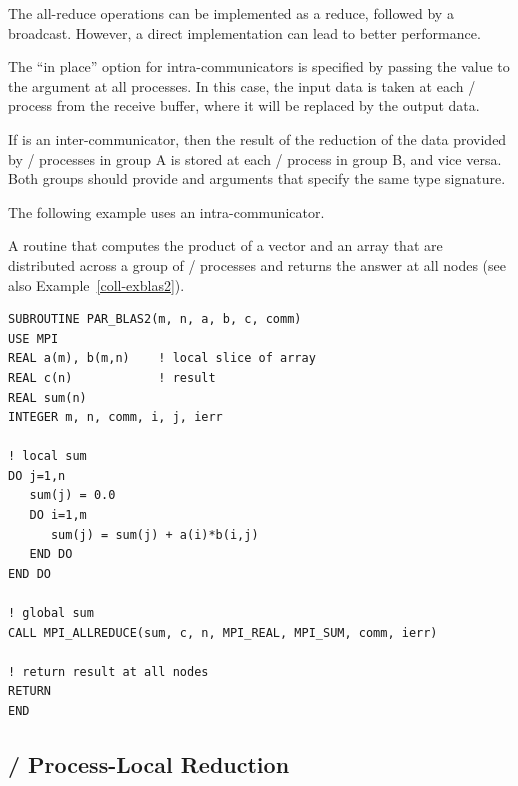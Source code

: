 \begin{implementors}
The all-reduce operations can be implemented as a reduce, followed by a
broadcast.  However, a direct implementation can lead to better performance.
\end{implementors}

The ``in place'' option  for intra-communicators is specified by passing the
value  to the argument 
at all processes.
In this case,
the input data is taken at each \MPI/ process from the receive buffer,
where it will be replaced by the output data.

If  is an inter-communicator, then the result of the reduction
of the data provided by \MPI/ processes in group A is stored at each \MPI/ process
in group B, and vice versa.
Both groups should
provide  and  arguments that specify the same type
signature.

The following example uses an intra-communicator.

\begin{example}
\label{coll-exallblas2}
%
A routine that computes
the product of a vector and an array that are distributed across a
group of \MPI/ processes and returns the answer at all nodes (see also
Example~\ref{coll-exblas2}).

\begin{lstlisting}[language={[MPI]Fortran}]
SUBROUTINE PAR_BLAS2(m, n, a, b, c, comm)
USE MPI
REAL a(m), b(m,n)    ! local slice of array
REAL c(n)            ! result
REAL sum(n)
INTEGER m, n, comm, i, j, ierr

! local sum
DO j=1,n
   sum(j) = 0.0
   DO i=1,m
      sum(j) = sum(j) + a(i)*b(i,j)
   END DO
END DO

! global sum
CALL MPI_ALLREDUCE(sum, c, n, MPI_REAL, MPI_SUM, comm, ierr)

! return result at all nodes
RETURN
END
\end{lstlisting}
\end{example}

\subsection{\texorpdfstring{\MPI/}{MPI} Process-Local Reduction}
\label{subsec:coll-process-local-reduction} %

